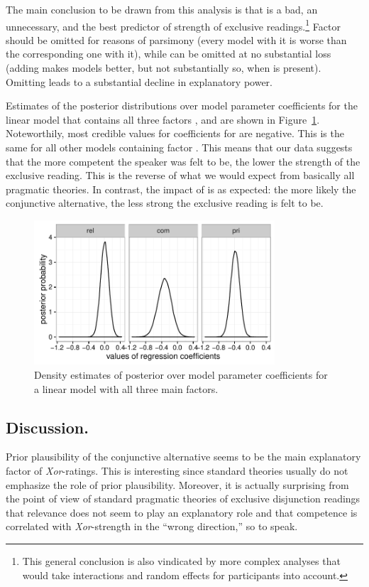 \documentclass[12pt]{article}
\begin{document}
The main conclusion to be drawn from this analysis is that \rel is a bad, \com an unnecessary,
and \pri the best predictor of strength of exclusive readings.\footnote{This general conclusion
  is also vindicated by more complex analyses that would take interactions and random effects
  for participants into account.} Factor \rel should be omitted for reasons of parsimony (every
model with it is worse than the corresponding one with it), while \com can be omitted at no
substantial loss (adding \com makes models better, but not substantially so, when \pri is
present). Omitting \pri leads to a substantial decline in explanatory power.

Estimates of the posterior distributions over model parameter coefficients for the linear model
that contains all three factors \rel, \com and \pri are shown in
Figure~\ref{fig:densityMCMC}. Noteworthily, most credible values for coefficients for \com are
negative. This is the same for all other models containing factor \com. This means that our
data suggests that the more competent the speaker was felt to be, the lower the strength of the
exclusive reading. This is the reverse of what we would expect from basically all pragmatic
theories. In contrast, the impact of \pri is as expected: the more likely the conjunctive
alternative, the less strong the exclusive reading is felt to be.

\begin{figure}
  \centering
  \includegraphics[width=0.8\textwidth]{pics/densityMCMCExp1.pdf}
  \caption{Density estimates of posterior over model parameter coefficients for a linear model
    with all three main factors.}
  \label{fig:densityMCMC}
\end{figure}

\subsection*{Discussion.} Prior plausibility of the conjunctive alternative seems to be the
main explanatory factor of \emph{Xor}-ratings. This is interesting since standard theories
usually do not emphasize the role of prior plausibility. Moreover, it is actually surprising
from the point of view of standard pragmatic theories of exclusive disjunction readings that
relevance does not seem to play an explanatory role and that competence is correlated with
\emph{Xor}-strength in the ``wrong direction,'' so to speak. 
\end{document}
